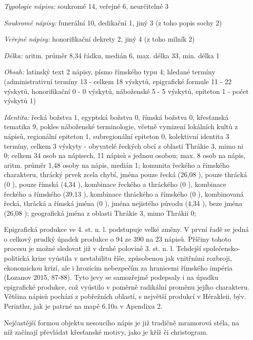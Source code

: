 {\em Typologie nápisu:} soukromé 14, veřejné 6, neurčitelné 3

{\em Soukromé nápisy:} funerální 10, dedikační 1, jiný 3 (z toho popis sochy 2)

{\em Veřejné nápisy:} honorifikační dekrety 2, jiný 4 (z toho milník 2)

{\em Délka:} aritm. průměr 8,34 řádku, medián 6, max. délka 33, min. délka 1

{\em Obsah:} latinský text 2 nápisy, písmo římského typu 4; hledané termíny (administrativní termíny 13 - celkem 18 výskytů, epigrafické formule 11 - 22 výskytů, honorifikační 0 - 0 výskytů, náboženské 5 - 5 výskytů, epiteton 1 - počet výskytů 1)

{\em Identita:} řecká božstva 1, egyptská božstva 0, římská božstva 0, křesťanská tematika 9, pokles náboženské terminologie, včetně vymizení lokálních kultů z nápisů, regionální epiteton 1, subregionální epiteton 0, kolektivní identita 3 termíny, celkem 3 výskyty - obyvatelé řeckých obcí z oblasti Thrákie 3, mimo ni 0; celkem 34 osob na nápisech, 11 nápisů s jednou osobou; max. 8 osob na nápis, aritm. průměr 1,48 osoby na nápis, medián 1; komunita řeckého a římského charakteru, thrácký prvek zcela chybí, jména pouze řecká (26,08 ), pouze thrácká (0 ), pouze římská (4,34 ), kombinace řeckého a thráckého (0 ), kombinace řeckého a římského (39,13 ), kombinace thráckého a římského (0 ), kombinovaná řecká, thrácká a římská jména (0 ), jména nejistého původu (4,34 ), beze jména (26,08 ); geografická jména z oblasti Thrákie 3, mimo Thrákii 0;

\NC\AR
\HL
\HL
\stoptable

Epigrafická produkce ve 4. st. n. l. podstupuje velké změny. V první řadě se jedná o celkový prudký úpadek produkce o 94  ze 390 na 23 nápisů. Příčiny tohoto procesu je možné sledovat již v druhé polovině 3. st. n. l. Tehdejší společensko-politická krize vyústila v nestabilitu říše, způsobenou jak vnitřními rozbroji, ekonomickou krizí, ale i hrozícím nebezpečím za hranicemi římského impéria (Lozanov 2015, 87-88). Tyto jevy se samozřejmě podepsaly i na úpadku epigrafické produkce, což vyústilo v poměrně radikální proměnu jejího charakteru. Většina nápisů pochází z pobřežních oblastí, s největší produkcí v Hérakleii, býv. Perinthu, jak je patrné na mapě 6.10a v Apendixu 2.

Nejčastější formou objektu nesoucího nápis je již tradičně mramorová stéla, na níž začínají převládat křesťanské motivy, jako je kříž či christogram.

